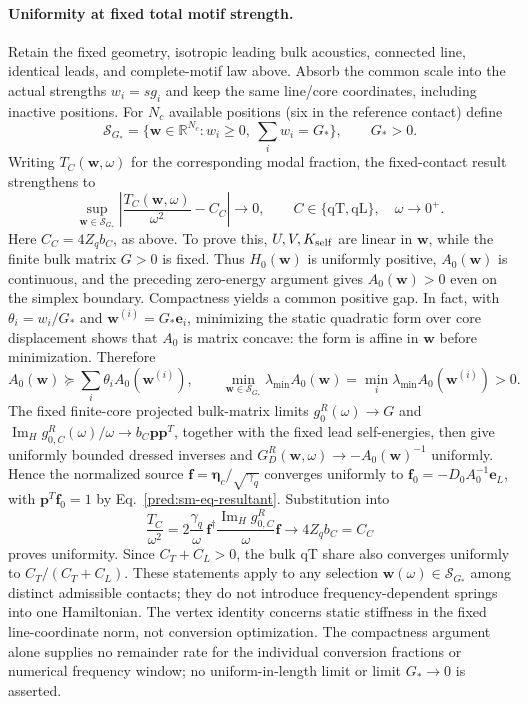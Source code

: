\documentclass[10pt,aps,onecolumn,notitlepage,nofootinbib]{revtex4-2}
\newcommand{\veta}{\bm\eta}
\newcommand{\qT}{\mathrm{qT}}
\newcommand{\qL}{\mathrm{qL}}
\newcommand{\ImH}{\operatorname{Im}_{\!H}}
\begin{document}
\paragraph*{Uniformity at fixed total motif strength.}
Retain the fixed geometry, isotropic leading bulk acoustics, connected line,
identical leads, and complete-motif law above. Absorb the common scale into
the actual strengths $w_i=s g_i$ and keep the same line/core coordinates,
including inactive positions. For $N_c$ available positions (six in the
reference contact) define
\[
 \mathcal S_{G_*}=\{\bm w\in\mathbb R^{N_c}:w_i\geq0,
                    \ \textstyle\sum_iw_i=G_*\},\qquad G_*>0.
\]
Writing $T_C(\bm w,\omega)$ for the corresponding modal fraction, the
fixed-contact result strengthens to
\[
 \sup_{\bm w\in\mathcal S_{G_*}}
 \left|\frac{T_C(\bm w,\omega)}{\omega^2}-C_C\right|
\longrightarrow0,\qquad C\in\{\qT,\qL\},\quad\omega\to0^+.
\]
Here $C_C=4Z_qb_C$, as above.
To prove this, $U,V,K_{\rm self}$ are linear in $\bm w$, while the finite
bulk matrix $G>0$ is fixed. Thus $H_0(\bm w)$ is uniformly positive,
$A_0(\bm w)$ is continuous, and the preceding zero-energy argument gives
$A_0(\bm w)>0$ even on the simplex boundary. Compactness yields a common
positive gap. In fact, with $\theta_i=w_i/G_*$ and
$\bm w^{(i)}=G_*\bm e_i$, minimizing the static quadratic form over core
displacement shows that $A_0$ is matrix concave: the form is affine in
$\bm w$ before minimization. Therefore
\[
 A_0(\bm w)\succeq\sum_i\theta_iA_0(\bm w^{(i)}),\qquad
 \min_{\bm w\in\mathcal S_{G_*}}\lambda_{\min}A_0(\bm w)
 =\min_i\lambda_{\min}A_0(\bm w^{(i)})>0.
\]
The fixed finite-core projected bulk-matrix limits $g_0^R(\omega)\to G$ and
$\ImH g_{0,C}^R(\omega)/\omega\to b_C\bm p\bm p^T$, together with the
fixed lead self-energies, then give uniformly bounded dressed inverses and
$G_D^R(\bm w,\omega)\to-A_0(\bm w)^{-1}$ uniformly. Hence the normalized
source $\bm f=\veta_c/\sqrt{\gamma_q}$ converges uniformly to
$\bm f_0=-D_0A_0^{-1}\bm e_L$, with
$\bm p^T\bm f_0=1$ by Eq.~\eqref{pred:sm-eq-resultant}. Substitution into
\[
 \frac{T_C}{\omega^2}
 =2\frac{\gamma_q}{\omega}\,
 \bm f^\dagger\frac{\ImH g_{0,C}^R}{\omega}\bm f
 \longrightarrow4Z_qb_C=C_C
\]
proves uniformity. Since $C_T+C_L>0$, the bulk qT share also converges
uniformly to $C_T/(C_T+C_L)$. These statements apply to any selection
$\bm w(\omega)\in\mathcal S_{G_*}$ among distinct admissible contacts;
they do not introduce frequency-dependent springs into one Hamiltonian.
The vertex identity concerns static stiffness in the fixed line-coordinate
norm, not conversion optimization. The compactness argument alone supplies no remainder rate for the individual conversion fractions or numerical frequency window; no uniform-in-length limit or limit $G_*\to0$ is asserted.
\end{document}
